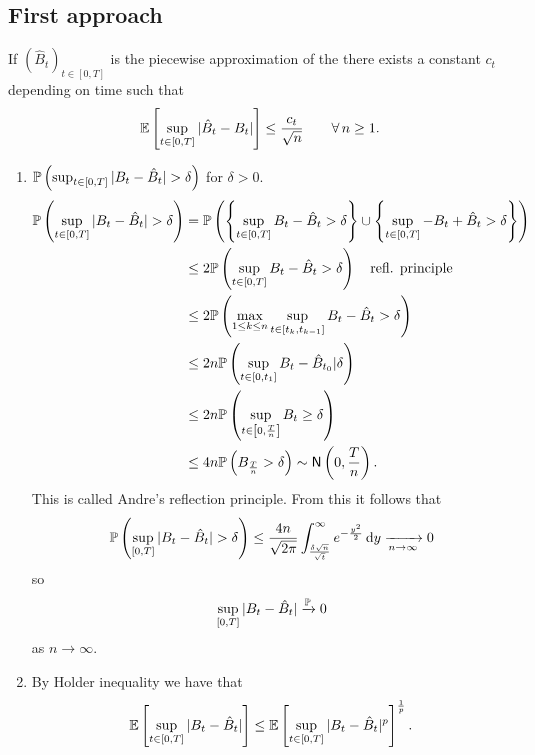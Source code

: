 \documentclass[12pt]{report}
\begin{document}
\subsection{First approach}
\begin{theorem}
	If ${(\hat{B}_{t})}_{t\in[0,T]}$ is the piecewise approximation of the \bwm{} there exists a constant $c_{t}$ depending on time such that
	\begin{equation*}
		\mathbb{E}\left[\sup_{t\in[0,T]}|\hat{B}_{t}-B_{t}|\right]\leq\frac{c_{t}}{\sqrt{n}}\qquad\forall\, n\geq 1.
	\end{equation*}
\end{theorem}
\begin{fancyproof}
	\begin{enumerate}[\circnum]
		\item $\pr\left(\sup_{t\in[0,T]}|B_{t}-\hat{B}_{t}|>\delta\right)$ for $\delta>0$.
		\begin{align*}
			\pr\left(\sup_{t\in[0,T]}|B_{t}-\hat{B}_{t}|>\delta\right)&=\pr\left(\left\{\sup_{t\in[0,T]}B_{t}-\hat{B}_{t}>\delta\right\}\cup\left\{\sup_{t\in[0,T]}-B_{t}+\hat{B}_{t}>\delta\right\}\right)\\
			&\leq 2\pr\left(\sup_{t\in[0,T]}B_{t}-\hat{B}_{t}>\delta\right)\quad\text{refl. principle}\\
			&\leq 2\pr\left(\max_{1\leq k\leq n}\sup_{t\in[t_{k},t_{k-1}]}B_{t}-\hat{B}_{t}>\delta\right)\\
			&\leq2n\pr\left(\sup_{t\in[0,t_{1}]}B_{t}-\hat{B}_{t_{0}}|\delta\right)\\
			&\leq2n\pr\left(\sup_{t\in\left[0,\frac{T}{n}\right]}B_{t}\geq\delta\right)\\
			&\leq4n\pr\left(B_{\frac{T}{n}}>\delta\right)\distnorm{0,\frac{T}{n}}.
		\end{align*}
		This is called Andre's reflection principle. From this it follows that 
		\begin{equation*}
			\pr\left(\sup_{[0,T]}|B_{t}-\hat{B}_{t}|>\delta\right)\leq\frac{4n}{\sqrt{2\pi}}\int_{\frac{\delta\sqrt{n}}{\sqrt{t}}}^{\infty}e^{-\frac{y^{2}}{2}}\dy\xrightarrow[n\to\infty]{}0
		\end{equation*}
		so
		\begin{equation*}
			\sup_{[0,T]}|B_{t}-\hat{B}_{t}|\xrightarrow[]{\mathbb{P}}0
		\end{equation*}
		as $n\to\infty$.
		\item By Holder inequality we have that
		\begin{equation*}
			\ev{\sup_{t\in[0,T]}|B_{t}-\hat{B}_{t}|}\leq\ev{\sup_{t\in[0,T]}|B_{t}-\hat{B}_{t}|^{p}}^{\frac{1}{p}}.

\end{equation*}
\end{enumerate}
\end{fancyproof}
\end{document}
